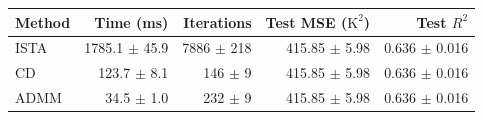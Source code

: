 \begin{tabular}{lrrrr}
\toprule
Method & Time (ms) & Iterations & Test MSE ($\mathrm{K}^2$) & Test $R^2$ \\
\midrule
ISTA & 1785.1 $\pm$ 45.9 & 7886 $\pm$ 218 & 415.85 $\pm$ 5.98 & 0.636 $\pm$ 0.016 \\
CD & 123.7 $\pm$ 8.1 & 146 $\pm$ 9 & 415.85 $\pm$ 5.98 & 0.636 $\pm$ 0.016 \\
ADMM & 34.5 $\pm$ 1.0 & 232 $\pm$ 9 & 415.85 $\pm$ 5.98 & 0.636 $\pm$ 0.016 \\
\bottomrule
\end{tabular}
